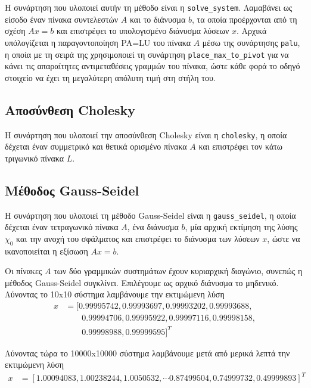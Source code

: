 \documentclass[a4paper,11pt]{article}
\newcommand{\lt}{\latintext}
\newcommand{\gt}{\greektext}
\begin{document}
\gt Η συνάρτηση που υλοποιεί αυτήν τη μέθοδο είναι η \lt \verb|solve_system|. \gt Λαμαβάνει ως είσοδο έναν πίνακα συντελεστών $Α$ και το διάνυσμα \lt $b$, \gt τα οποία προέρχονται από τη σχέση \(Ax = b\) και επιστρέφει το υπολογισμένο διάνυσμα λύσεων $x$. Αρχικά υπόλογίζεται η παραγοντοποίηση \lt PA=LU \gt του πίνακα $Α$ μέσω της συνάρτησης \lt \verb|palu|, \gt η οποία με τη σειρά της χρησιμοποιεί τη συνάρτηση \lt \verb|place_max_to_pivot| \gt για να κάνει τις απαραίτητες αντιμεταθέσεις γραμμών του πίνακα, ώστε κάθε φορά το οδηγό στοιχείο να έχει τη μεγαλύτερη απόλυτη τιμή στη στήλη του.

\subsection{Αποσύνθεση \lt Cholesky}

\gt Η συνάρτηση που υλοποιεί την αποσύνθεση \lt Cholesky \gt είναι η \lt \verb|cholesky|, \gt η οποία δέχεται έναν συμμετρικό και θετικά ορισμένο πίνακα $A$ και επιστρέφει τον κάτω τριγωνικό πίνακα $L$.

\subsection{Μέθοδος \lt Gauss-Seidel}

\gt Η συνάρτηση που υλοποιεί τη μέθοδο \lt Gauss-Seidel \gt είναι η \lt \verb|gauss_seidel|, \gt η οποία δέχεται έναν τετραγωνικό πίνακα $A$, ένα διάνυσμα $b$, μία αρχική εκτίμηση της λύσης $χ_0$ και την ανοχή του σφάλματος και επιστρέφει το διάνυσμα των λύσεων $x$, ώστε να ικανοποιείται η εξίσωση $Ax=b$.

Οι πίνακες $Α$ των δύο γραμμικών συστημάτων έχουν κυριαρχική διαγώνιο, συνεπώς η μέθοδος \lt Gauss-Seidel \gt συγκλίνει. Επιλέγουμε ως αρχικό διάνυσμα το μηδενικό. Λύνοντας το \lt 10x10 \gt σύστημα λαμβάνουμε την εκτιμώμενη λύση 
\begin{align*}
   x &= [0.99995742, 0.99993697, 0.99993202, 0.99993688, \\ &\qquad0.99994706, 0.99995922, 0.99997116, 0.99998158,\\ &\qquad0.99998988, 0.99999595]^{T}
\end{align*}

Λύνοντας τώρα το \lt 10000x10000 \gt σύστημα λαμβάνουμε μετά από μερικά λεπτά την εκτιμώμενη λύση
\begin{align*}
    x &= [1.00094083, 1.00238244, 1.0050532,  \cdots 0.87499504, 0.74999732, 0.49999893]^{T}
\end{align*}
\end{document}
